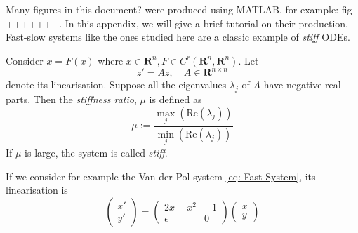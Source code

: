 
Many figures in this document? were produced using MATLAB, for example: fig +++++++. In this appendix, we will give a brief tutorial on their production. Fast-slow systems like the ones studied here are a classic example of \emph{stiff} ODEs. 
\begin{definition}
	Consider $\dot{x} = F(x)$ where $x\in \mathbf{R}^n, F\in C^r(\mathbf{R}^n,\mathbf{R}^n)$. Let 
	$$ z' = Az,\quad A\in \mathbf{R}^{n \times n}  $$
	denote its linearisation. Suppose all the eigenvalues $\lambda_j$  of $A$ have negative real parts. Then the \emph{stiffness ratio}, $\mu$ is defined as
	$$ \mu :=\frac{\max_j(\mathrm{Re}(\lambda_j))}{\min_j(\mathrm{Re}(\lambda_j))} $$
	If $\mu$ is large, the system is called \emph{stiff}.
\end{definition}
If we consider for example the Van der Pol system \ref{eq: Fast System}, its linearisation is
$$ \begin{pmatrix}
x' \\ 
y'
\end{pmatrix}  = \begin{pmatrix}
2x-x^2 & -1 \\ 
\epsilon & 0
\end{pmatrix}  \begin{pmatrix}
x\\y	
\end{pmatrix}  $$
